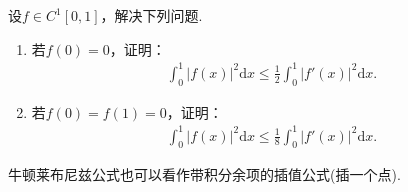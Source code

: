 \documentclass[../../main.tex]{subfiles}
\begin{document}
\begin{example}
设\(f \in C^1[0, 1]\)，解决下列问题.
\begin{enumerate}
\item 若\(f(0) = 0\)，证明：
\begin{align*}
\int_{0}^{1}|f(x)|^{2}\mathrm{d}x \leqslant \frac{1}{2}\int_{0}^{1}|f'(x)|^{2}\mathrm{d}x.
\end{align*}

\item 若\(f(0) = f(1) = 0\)，证明：
\begin{align*}
\int_{0}^{1}|f(x)|^{2}\mathrm{d}x \leqslant \frac{1}{8}\int_{0}^{1}|f'(x)|^{2}\mathrm{d}x.
\end{align*}
\end{enumerate}
\end{example}
\begin{remark}
牛顿莱布尼兹公式也可以看作带积分余项的插值公式(插一个点).
\end{remark}
\end{document}
